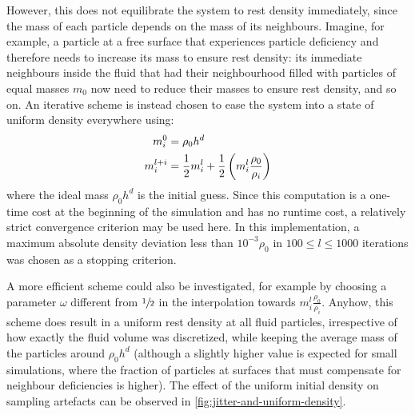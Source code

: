 However, this does not equilibrate the system  to rest density immediately, since the mass of each particle depends on the mass of its neighbours. Imagine, for example, a particle at a free surface that experiences particle deficiency and therefore needs to increase its mass to ensure rest density: its immediate neighbours inside the fluid that had their neighbourhood filled with particles of equal masses $m_0$ now need to reduce their masses to ensure rest density, and so on. An iterative scheme is instead chosen to ease the system into a state of uniform density everywhere using:
\begin{align}
  m_i^0     & = \rho_0 h^d                                                     \\
  m_i^{l+i} & = \frac{1}{2}m_i^l + \frac{1}{2}\left(m_i^l \frac{\rho_0}{\rho_i}\right)
\end{align}
where the ideal mass $\rho_0 h^d$ is the initial guess. Since this computation is a one-time cost at the beginning of the simulation and has no runtime cost, a relatively strict convergence criterion may be used here. In this implementation, a maximum absolute density deviation less than $10^{-3}\rho_0$ in $100\leq l \leq 1000$ iterations was chosen as a stopping criterion.


A more efficient scheme could also be investigated, for example by choosing a parameter $\omega$ different from $\sfrac{1}{2}$ in the interpolation towards $m_i^l \frac{\rho_0}{\rho_i}$. Anyhow, this scheme does result in a uniform rest density at all fluid particles, irrespective of how exactly the fluid volume was discretized, while keeping the average mass of the particles around $\rho_0 h^d$ (although a slightly higher value is expected for small simulations, where the fraction of particles at surfaces that must compensate for neighbour deficiencies is higher). The effect of the uniform initial density on sampling artefacts can be observed in \autoref{fig:jitter-and-uniform-density}.


